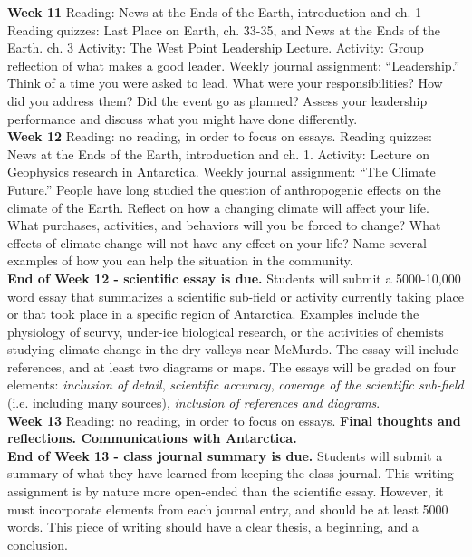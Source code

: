 \documentclass[10pt]{article}
\begin{document}
\begin{outline}[enumerate]
\1 \textbf{Week 11}
\2 Reading:  News at the Ends of the Earth, introduction and ch. 1
\2 Reading quizzes: Last Place on Earth, ch. 33-35, and News at the Ends of the Earth. ch. 3
\2 Activity: The West Point Leadership Lecture.
\2 Activity: Group reflection of what makes a good leader.
\2 Weekly journal assignment: ``Leadership.'' Think of a time you were asked to lead.  What were your responsibilities?  How did you address them?  Did the event go as planned?  Assess your leadership performance and discuss what you might have done differently. \\
\1 \textbf{Week 12}
\2 Reading: no reading, in order to focus on essays.
\2 Reading quizzes: News at the Ends of the Earth, introduction and ch. 1.
\2 Activity: Lecture on Geophysics research in Antarctica.
\2 Weekly journal assignment: ``The Climate Future.'' People have long studied the question of anthropogenic effects on the climate of the Earth.  Reflect on how a changing climate will affect your life.  What purchases, activities, and behaviors will you be forced to change?  What effects of climate change will not have any effect on your life?  Name several examples of how you can help the situation in the community. \\
\1 \textbf{End of Week 12 - scientific essay is due.} Students will submit a 5000-10,000 word essay that summarizes a scientific sub-field or activity currently taking place or that took place in a specific region of Antarctica.  Examples include the physiology of scurvy, under-ice biological research, or the activities of chemists studying climate change in the dry valleys near McMurdo.  The essay will include references, and at least two diagrams or maps.  The essays will be graded on four elements: \textit{inclusion of detail}, \textit{scientific accuracy}, \textit{coverage of the scientific sub-field} (i.e. including many sources), \textit{inclusion of references and diagrams}. \\
\1 \textbf{Week 13}
\2 Reading: no reading, in order to focus on essays.
\2 \textbf{Final thoughts and reflections.  Communications with Antarctica.} \\
\1 \textbf{End of Week 13 - class journal summary is due.} Students will submit a summary of what they have learned from keeping the class journal.  This writing assignment is by nature more open-ended than the scientific essay.  However, it must incorporate elements from each journal entry, and should be at least 5000 words.  This piece of writing should have a clear thesis, a beginning, and a conclusion.
\end{outline}
\end{document}
